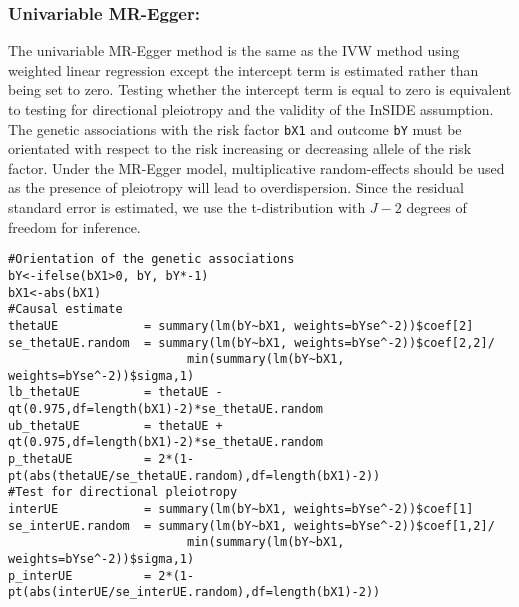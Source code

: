 \documentclass[a4paper,12pt]{article}
\begin{document}
\subsubsection*{Univariable MR-Egger:}
\normalsize{The univariable MR-Egger method is the same as the IVW method using weighted linear regression except the intercept term is estimated rather than being set to zero. Testing whether the intercept term is equal to zero is equivalent to testing for directional pleiotropy and the validity of the InSIDE assumption. The genetic associations with the risk factor \texttt{bX1} and outcome \texttt{bY} must be orientated with respect to the risk increasing or decreasing allele of the risk factor.  Under the MR-Egger model, multiplicative random-effects should be used as the presence of pleiotropy will lead to overdispersion. Since the residual standard error is estimated, we use the t-distribution with $J-2$ degrees of freedom for inference.}

\scriptsize{
\begin{verbatim}
#Orientation of the genetic associations
bY<-ifelse(bX1>0, bY, bY*-1)
bX1<-abs(bX1)
#Causal estimate
thetaUE            = summary(lm(bY~bX1, weights=bYse^-2))$coef[2]
se_thetaUE.random  = summary(lm(bY~bX1, weights=bYse^-2))$coef[2,2]/
                         min(summary(lm(bY~bX1, weights=bYse^-2))$sigma,1)
lb_thetaUE         = thetaUE - qt(0.975,df=length(bX1)-2)*se_thetaUE.random
ub_thetaUE         = thetaUE + qt(0.975,df=length(bX1)-2)*se_thetaUE.random
p_thetaUE          = 2*(1-pt(abs(thetaUE/se_thetaUE.random),df=length(bX1)-2))
#Test for directional pleiotropy
interUE            = summary(lm(bY~bX1, weights=bYse^-2))$coef[1]
se_interUE.random  = summary(lm(bY~bX1, weights=bYse^-2))$coef[1,2]/
                         min(summary(lm(bY~bX1, weights=bYse^-2))$sigma,1)
p_interUE          = 2*(1-pt(abs(interUE/se_interUE.random),df=length(bX1)-2))
\end{verbatim}
}
\end{document}
